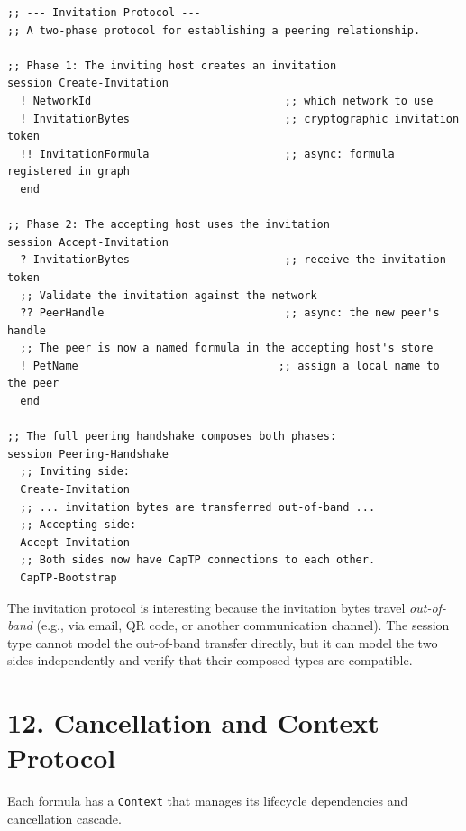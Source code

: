 \documentclass[11pt]{article}
\begin{document}
\begin{verbatim}
;; --- Invitation Protocol ---
;; A two-phase protocol for establishing a peering relationship.

;; Phase 1: The inviting host creates an invitation
session Create-Invitation
  ! NetworkId                              ;; which network to use
  ! InvitationBytes                        ;; cryptographic invitation token
  !! InvitationFormula                     ;; async: formula registered in graph
  end

;; Phase 2: The accepting host uses the invitation
session Accept-Invitation
  ? InvitationBytes                        ;; receive the invitation token
  ;; Validate the invitation against the network
  ?? PeerHandle                            ;; async: the new peer's handle
  ;; The peer is now a named formula in the accepting host's store
  ! PetName                               ;; assign a local name to the peer
  end

;; The full peering handshake composes both phases:
session Peering-Handshake
  ;; Inviting side:
  Create-Invitation
  ;; ... invitation bytes are transferred out-of-band ...
  ;; Accepting side:
  Accept-Invitation
  ;; Both sides now have CapTP connections to each other.
  CapTP-Bootstrap
\end{verbatim}

The invitation protocol is interesting because the invitation bytes travel
\emph{out-of-band} (e.g., via email, QR code, or another communication channel).
The session type cannot model the out-of-band transfer directly, but it can
model the two sides independently and verify that their composed types are
compatible.
\section{12. Cancellation and Context Protocol}
\label{sec:org36833a5}

Each formula has a \texttt{Context} that manages its lifecycle dependencies and
cancellation cascade.
\end{document}
